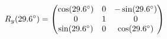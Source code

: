 \documentclass[preview]{standalone}
\begin{document}
\begin{align*}
\special{dvisvgm:raw <g id='unique000'>}R_y(29.6^\circ) = \begin{pmatrix} \cos(29.6^\circ) & 0 & -\sin(29.6^\circ) \\ 0 & 1 & 0 \\ \sin(29.6^\circ) & 0 & \cos(29.6^\circ) \end{pmatrix}\special{dvisvgm:raw </g>}
\end{align*}
\end{document}

